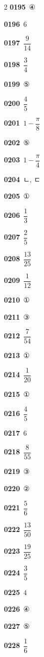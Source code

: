 \documentclass[10pt,a4paper]{article}
\begin{document}
\begin{multicols}{2}
\noindent\textbf{0195}\ ④\par
\noindent\textbf{0196}\ $6$\par
\noindent\textbf{0197}\ $\dfrac{9}{14}$\par
\noindent\textbf{0198}\ $\dfrac{3}{4}$\par
\noindent\textbf{0199}\ ⑤\par
\noindent\textbf{0200}\ $\dfrac{4}{5}$\par
\noindent\textbf{0201}\ $1-\dfrac{\pi}{8}$\par
\noindent\textbf{0202}\ ⑤\par
\noindent\textbf{0203}\ $1-\dfrac{\pi}{4}$\par
\noindent\textbf{0204}\ ㄴ, ㄷ\par
\noindent\textbf{0205}\ ①\par
\noindent\textbf{0206}\ $\dfrac{1}{3}$\par
\noindent\textbf{0207}\ $\dfrac{2}{5}$\par
\noindent\textbf{0208}\ $\dfrac{13}{25}$\par
\noindent\textbf{0209}\ $\dfrac{1}{12}$\par
\noindent\textbf{0210}\ ①\par
\noindent\textbf{0211}\ ③\par
\noindent\textbf{0212}\ $\dfrac{7}{54}$\par
\noindent\textbf{0213}\ ①\par
\noindent\textbf{0214}\ $\dfrac{1}{20}$\par
\noindent\textbf{0215}\ ①\par
\noindent\textbf{0216}\ $\dfrac{4}{5}$\par
\noindent\textbf{0217}\ $6$\par
\noindent\textbf{0218}\ $\dfrac{8}{55}$\par
\noindent\textbf{0219}\ ③\par
\noindent\textbf{0220}\ ②\par
\noindent\textbf{0221}\ $\dfrac{5}{6}$\par
\noindent\textbf{0222}\ $\dfrac{13}{50}$\par
\noindent\textbf{0223}\ $\dfrac{19}{25}$\par
\noindent\textbf{0224}\ $\dfrac{3}{5}$\par
\noindent\textbf{0225}\ $4$\par
\noindent\textbf{0226}\ ④\par
\noindent\textbf{0227}\ ⑤\par
\noindent\textbf{0228}\ $\dfrac{1}{6}$\par

\end{multicols}
\end{document}
